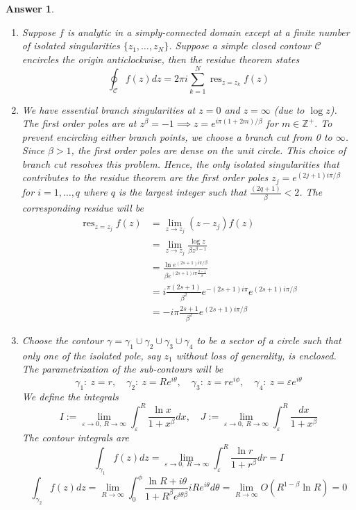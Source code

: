 \documentclass[a4paper]{article}
\DeclareMathOperator{\res}{res}
\newtheorem{ans}{Answer}[section]
\theoremstyle{new}
\begin{document}
\begin{ans}\leavevmode
\begin{enumerate}[label=(\roman*)]
\item 
Suppose $f$ is analytic in a simply-connected domain except at a finite number of isolated singularities $\{z_1,\dots,z_N\}$. Suppose a simple closed contour $\mathcal{C}$ encircles the origin anticlockwise, then the residue theorem states
$$\oint_{\mathcal{C}} f(z)dz=2\pi i\sum_{k=1}^N\res_{z=z_k}f(z)$$
\item We have essential branch singularities at $z=0$ and $z=\infty$ (due to $\log z$). The first order poles are at $z^\beta=-1\implies z=e^{i\pi(1+2m)/\beta}$ for $m\in\mathbb{Z}^+$. To prevent encircling either branch points, we choose a branch cut from 0 to $\infty$. Since $\beta>1$, the first order poles are dense on the unit circle. This choice of branch cut resolves this problem. Hence, the only isolated singularities that contributes to the residue theorem are the first order poles $z_j=e^{(2j+1)i\pi/\beta}$ for $i=1,\dots,q$ where $q$ is the largest integer such that $\frac{(2q+1)}{\beta}<2$. The corresponding residue will be
\begin{align}
\res_{z=z_j}f(z)&=\lim_{z\rightarrow z_j}(z-z_j)f(z)\nonumber\\&=\lim_{z\rightarrow z_j}\frac{\log z}{\beta z^{\beta-1}}\nonumber\\&=\frac{\ln e^{(2s+1)i\pi/\beta}}{\beta e^{(2s+1)i\pi\frac{\beta-1}{\beta}}}\nonumber\\&=i\frac{\pi(2s+1)}{\beta^2}e^{-(2s+1)i\pi}e^{(2s+1)i\pi/\beta}\nonumber\\&=-i\pi\frac{2s+1}{\beta^2}e^{(2s+1)i\pi/\beta}\nonumber
\end{align}
\item Choose the contour $\gamma=\gamma_1\cup\gamma_2\cup\gamma_3\cup\gamma_4$ to be a sector of a circle such that only one of the isolated pole, say $z_1$ without loss of generality, is enclosed. The parametrization of the sub-contours will be
$$\gamma_1:~z=r,\quad\gamma_2:~z=Re^{i\theta},\quad \gamma_3:~z=re^{i\phi},\quad\gamma_4:~z=\varepsilon e^{i\theta}$$
We define the integrals 
$$I:=\lim_{\varepsilon\rightarrow 0,~R\rightarrow\infty}\int_{\varepsilon}^R\frac{\ln x}{1+x^\beta}dx,\quad J:=\lim_{\varepsilon\rightarrow 0,~R\rightarrow\infty}\int_{\varepsilon}^R\frac{dx}{1+x^\beta}$$
The contour integrals are
$$\int_{\gamma_1}f(z)dz=\lim_{\varepsilon\rightarrow 0,~R\rightarrow\infty}\int_{\varepsilon}^R\frac{\ln r}{1+r^\beta}dr=I$$
$$\int_{\gamma_2}f(z)dz=\lim_{R\rightarrow\infty}\int_0^\phi\frac{\ln R+i\theta}{1+R^\beta e^{i\theta\beta}}iRe^{i\theta}d\theta=\lim_{R\rightarrow\infty}O(R^{1-\beta}\ln R)=0$$

\end{enumerate}
\end{ans}
\end{document}
